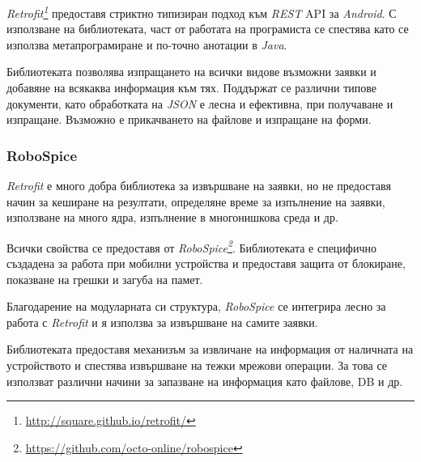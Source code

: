 		\emph{Retrofit\footnote{\url{http://square.github.io/retrofit/}}} предоставя стриктно типизиран подход към \emph{REST} \ac{API} за \emph{Android}. С използване на библиотеката, част от работата на програмиста се спестява като се използва метапрограмиране и по-точно анотации в \emph{Java}.
		
		Библиотеката позволява изпращането на всички видове възможни заявки и добавяне на всякаква информация към тях. Поддържат се различни типове документи, като обработката на \emph{JSON} е лесна и ефективна, при получаване и изпращане. Възможно е прикачването на файлове и изпращане на форми.
		
		\subsubsection{RoboSpice}
		
		\emph{Retrofit} е много добра библиотека за извършване на заявки, но не предоставя начин за кеширане на резултати, определяне време за изпълнение на заявки, използване на много ядра, изпълнение в многонишкова среда и др.
		
		Всички свойства се предоставя от \emph{RoboSpice\footnote{\url{https://github.com/octo-online/robospice}}}. Библиотеката е специфично създадена за работа при мобилни устройства и предоставя защита от блокиране, показване на грешки и загуба на памет.
		
		Благодарение на модуларната си структура, \emph{RoboSpice} се интегрира лесно за работа с \emph{Retrofit} и я използва за извършване на самите заявки.
		
		Библиотеката предоставя механизъм за извличане на информация от наличната на устройството и спестява извършване на тежки мрежови операции. За това се използват различни начини за запазване на информация като файлове, \ac{DB} и др.